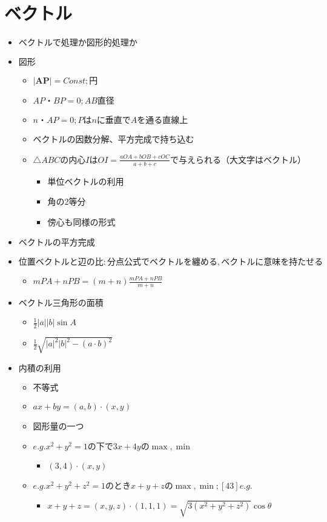 \documentclass[dvipdfmx,uplatex]{jsarticle}
\begin{document}
\section{ベクトル}
\begin{itemize}
	\item $ ベクトルで処理か図形的処理か$
	\item $ 図形$
	\begin{itemize}
		\item $ |\bm{AP}| = Const ;円$
		\item $ AP・BP = 0 ;AB直径$
		\item $ n・AP = 0 ;Pはnに垂直でAを通る直線上$
		\item ベクトルの因数分解、平方完成で持ち込む
		\item $△ABCの内心IはOI=\frac{aOA+bOB+cOC}{a+b+c}で与えられる（大文字はベクトル）$
		\begin{itemize}
			\item 単位ベクトルの利用
			\item 角の2等分
			\item 傍心も同様の形式
		\end{itemize}
	\end{itemize}
	\item $ ベクトルの平方完成$
	\item $ 位置ベクトルと辺の比:分点公式でベクトルを纏める,ベクトルに意味を持たせる$
	\begin{itemize}
		\item $mPA+nPB=(m+n)\frac{mPA+nPB}{m+n}$
	\end{itemize}
	\item $ ベクトル三角形の面積$
	\begin{itemize}
		\item $ \frac{1}{2}|a||b| \sin A$
		\item $ \frac{1}{2} \sqrt{|a|^2|b|^2 - (a \cdot b)^2}$
	\end{itemize}
	\item $ 内積の利用$
	\begin{itemize}
		\item $ 不等式$
		\item $ax+by=(a,b) \cdot (x,y)$
		\item 図形量の一つ
		\item $e.g. x^2+y^2=1の下で3x+4yの\max,\min$
		\begin{itemize}
			\item $(3,4)\cdot(x,y)$
		\end{itemize}
		\item $e.g. x^2+y^2+z^2=1のときx+y+zの\max,\min;[43]e.g.$
		\begin{itemize}
			\item $x+y+z=(x,y,z)\cdot (1,1,1)=\sqrt{3(x^2+y^2+z^2)} \cos \theta$
		\end{itemize}

	\end{itemize}
\end{itemize}
\end{document}
